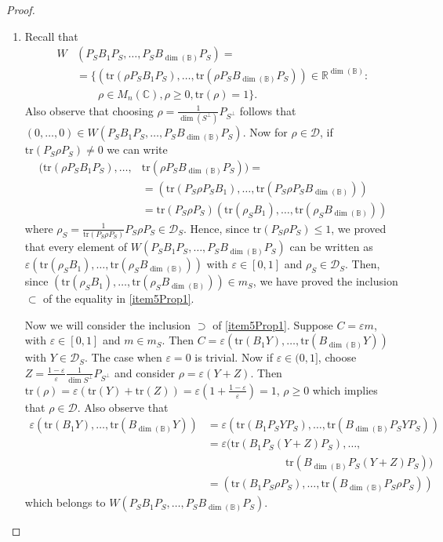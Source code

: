 \documentclass[12pt,a4paper]{article}
\def\calD{\mathcal D}
\def\R{\mathbb R}
\def\C{\mathbb C}
\def\tr{\text{tr}}
\numberwithin{equation}{section}
\begin{document}
\begin{proof}
\begin{enumerate}
	
	\item[\ref{item4Prop1} $\Rightarrow$ \ref{item5Prop1}.] 
	Recall that
	\begin{equation*}
		\begin{split}
			W&(P_SB_1P_S,\dots,P_SB_{{\dim(\mathbb{B})}}P_S)=\\
			&=\{\left(\tr(\rho P_SB_1P_S), \dots, \tr(\rho P_SB_{\dim(\mathbb{B})}P_S)\right)\in\R^{\dim(\mathbb{B})}:
			 \\&  
			\qquad \rho\in M_n(\C),\rho\geq 0, \tr(\rho)=1\}.
		\end{split}
	\end{equation*} 
	Also observe that choosing $\rho=\frac1{\dim(S^\perp)}P_{S^\perp}$ follows that $(0,\dots,0)\in W(P_SB_1P_S,\dots,P_SB_{{\dim(\mathbb{B})}}P_S)$. Now for $\rho\in\mathcal{D}$, if $\tr(P_S\rho P_S)\neq 0$ we can write
	\begin{equation*}
		\begin{split}
			(\tr(\rho P_SB_1 P_S),\dots,&\tr(\rho P_SB_{\dim(\mathbb{B})} P_S))=\\
			&=(\tr(P_S\rho P_SB_1 ),\dots,\tr(P_S\rho P_SB_{\dim(\mathbb{B})}))\\
			&=
			\tr(P_S\rho P_S)(\tr(\rho_S B_1 ),\dots,\tr(\rho_S B_{\dim(\mathbb{B})}))		
		\end{split}
	\end{equation*}
	where $\rho_S=\frac1{\tr(P_S\rho P_S)}P_S\rho P_S\in \calD_S$. Hence, since $\tr(P_S\rho P_S)\leq 1$, we proved that every element of $W(P_SB_1P_S,\dots,P_SB_{{\dim(\mathbb{B})}}P_S)$ can be written as $\varepsilon(\tr(\rho_S B_1 ),\dots,\tr(\rho_S B_{\dim(\mathbb{B})}))$ with $\varepsilon\in[0,1]$ and $\rho_S\in \calD_S$. Then, since $(\tr(\rho_S B_1 ),\dots,\tr(\rho_S B_{\dim(\mathbb{B})}))\in m_S$, we have proved the inclusion $\subset$ of the equality in \ref{item5Prop1}.
	
	Now we will consider the inclusion $\supset$ of \ref{item5Prop1}. Suppose $C=\varepsilon m$, with $\varepsilon\in[0,1]$ and $m\in m_S$. Then $C=\varepsilon (\tr(B_1 Y),\dots ,\tr(B_{\dim(\mathbb{B})} Y))$ with $Y\in\calD_S$. The case when $\varepsilon=0$ is trivial. Now if $\varepsilon\in(0,1]$, choose $Z= \frac{1-\varepsilon}{\varepsilon} \frac1{\dim S^\perp}P_{S^\perp}$ and consider $\rho=\varepsilon(Y+Z)$. Then $\tr(\rho)=\varepsilon (\tr(Y)+\tr(Z))=\varepsilon (1+\frac{1-\varepsilon}{\varepsilon})=1$, $\rho\geq 0$ which implies that $\rho\in\calD$. Also observe that
	\begin{equation*}
		\begin{split}
			\varepsilon(\tr(B_1 Y),\dots ,\tr(B_{\dim(\mathbb{B})} Y))&=
			\varepsilon(\tr(B_1 P_S Y P_S),\dots ,\tr(B_{\dim(\mathbb{B})} P_SY P_S)) \\
			&=\varepsilon
			(\tr(B_1 P_S (Y+Z) P_S),\dots ,\\
			& \hspace{3cm} \tr(B_{\dim(\mathbb{B})} P_S(Y+Z) P_S))\\
			&=(\tr(B_1 P_S \rho P_S),\dots ,\tr(B_{\dim(\mathbb{B})} P_S\rho P_S))
			\end{split}
	\end{equation*}
	which belongs to $W(P_SB_1P_S,\dots,P_SB_{{\dim(\mathbb{B})}}P_S)$.
	

\end{enumerate}
\end{proof}
\end{document}
